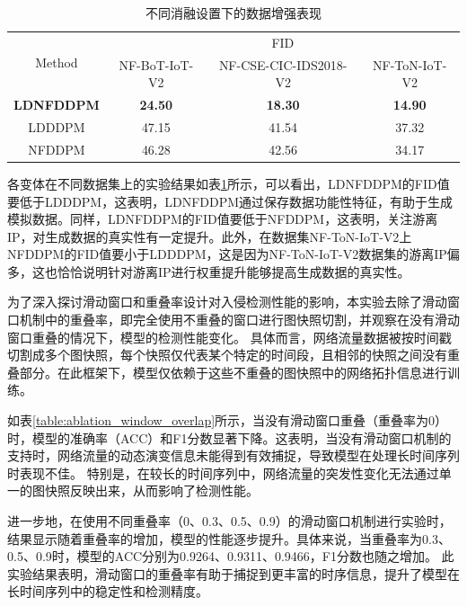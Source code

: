 \documentclass[promaster]{thesis-uestc}
\begin{document}
\begin{table}[h!]
\centering
\caption{不同消融设置下的数据增强表现}
\begin{tabular}{c||ccc}
\hline\hline
\multirow{2}{*}{Method} & \multicolumn{3}{c}{FID}                               \\
                        & NF-BoT-IoT-V2 & NF-CSE-CIC-IDS2018-V2 & NF-ToN-IoT-V2 \\ \hline
\textbf{LDNFDDPM}                & \textbf{24.50}         & \textbf{18.30}                 & \textbf{14.90}        \\\hline
LDDDPM                  & 47.15         & 41.54                 & 37.32         \\ \hline
NFDDPM                  & 46.28         & 42.56                 & 34.17         \\
\hline\hline
\end{tabular}
\label{Data_augmentation_based_on_ablation}
\end{table}

各变体在不同数据集上的实验结果如表\ref{Data_augmentation_based_on_ablation}所示，可以看出，LDNFDDPM的FID值要低于LDDDPM，这表明，LDNFDDPM通过保存数据功能性特征，有助于生成模拟数据。同样，LDNFDDPM的FID值要低于NFDDPM，这表明，关注游离IP，对生成数据的真实性有一定提升。此外，在数据集NF-ToN-IoT-V2上NFDDPM的FID值要小于LDDDPM，这是因为NF-ToN-IoT-V2数据集的游离IP偏多，这也恰恰说明针对游离IP进行权重提升能够提高生成数据的真实性。


为了深入探讨滑动窗口和重叠率设计对入侵检测性能的影响，本实验去除了滑动窗口机制中的重叠率，即完全使用不重叠的窗口进行图快照切割，并观察在没有滑动窗口重叠的情况下，模型的检测性能变化。
具体而言，网络流量数据被按时间戳切割成多个图快照，每个快照仅代表某个特定的时间段，且相邻的快照之间没有重叠部分。在此框架下，模型仅依赖于这些不重叠的图快照中的网络拓扑信息进行训练。

如表\ref{table:ablation_window_overlap}所示，当没有滑动窗口重叠（重叠率为0）时，模型的准确率（ACC）和F1分数显著下降。这表明，当没有滑动窗口机制的支持时，网络流量的动态演变信息未能得到有效捕捉，导致模型在处理长时间序列时表现不佳。
特别是，在较长的时间序列中，网络流量的突发性变化无法通过单一的图快照反映出来，从而影响了检测性能。

进一步地，在使用不同重叠率（0、0.3、0.5、0.9）的滑动窗口机制进行实验时，结果显示随着重叠率的增加，模型的性能逐步提升。具体来说，当重叠率为0.3、0.5、0.9时，模型的ACC分别为0.9264、0.9311、0.9466，F1分数也随之增加。
此实验结果表明，滑动窗口的重叠率有助于捕捉到更丰富的时序信息，提升了模型在长时间序列中的稳定性和检测精度。
\end{document}
